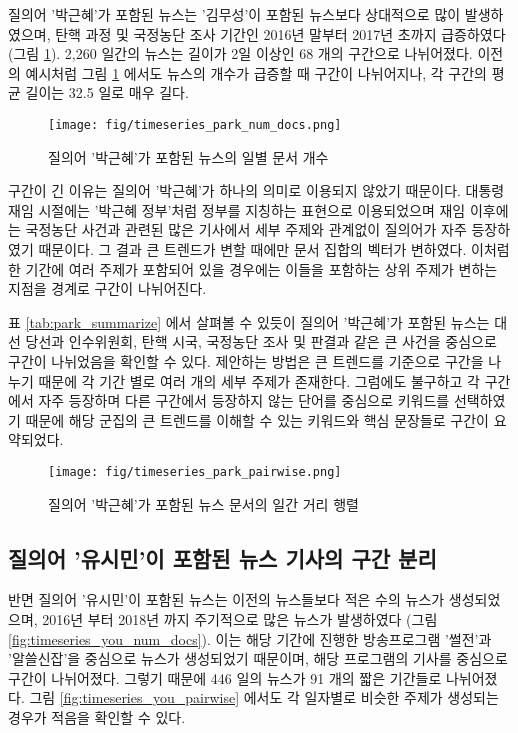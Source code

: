 \documentclass[oneside, ko,phd]{snuthesis_utf8_kor}
\begin{document}
질의어 '박근혜'가 포함된 뉴스는 '김무성'이 포함된 뉴스보다 상대적으로 많이 발생하였으며, 탄핵 과정 및 국정농단 조사 기간인 2016년 말부터 2017년 초까지 급증하였다 (그림 \ref{fig:timeseries_park_num_docs}).
2,260 일간의 뉴스는 길이가 2일 이상인 68 개의 구간으로 나뉘어졌다.
이전의 예시처럼 그림 \ref{fig:timeseries_park_num_docs} 에서도 뉴스의 개수가 급증할 때 구간이 나뉘어지나, 각 구간의 평균 길이는 32.5 일로 매우 길다.

\begin{figure}[H]
\centering
\texttt{[image: fig/timeseries\_park\_num\_docs.png]}
\caption{질의어 '박근혜'가 포함된 뉴스의 일별 문서 개수}
\label{fig:timeseries_park_num_docs}
\end{figure}

구간이 긴 이유는 질의어 '박근혜'가 하나의 의미로 이용되지 않았기 때문이다.
대통령 재임 시절에는 '박근혜 정부'처럼 정부를 지칭하는 표현으로 이용되었으며 재임 이후에는 국정농단 사건과 관련된 많은 기사에서 세부 주제와 관계없이 질의어가 자주 등장하였기 때문이다.
그 결과 큰 트렌드가 변할 때에만 문서 집합의 벡터가 변하였다.
이처럼 한 기간에 여러 주제가 포함되어 있을 경우에는 이들을 포함하는 상위 주제가 변하는 지점을 경계로 구간이 나뉘어진다.

표 \ref{tab:park_summarize} 에서 살펴볼 수 있듯이 질의어 '박근혜'가 포함된 뉴스는 대선 당선과 인수위원회, 탄핵 시국, 국정농단 조사 및 판결과 같은 큰 사건을 중심으로 구간이 나뉘었음을 확인할 수 있다.
제안하는 방법은 큰 트렌드를 기준으로 구간을 나누기 때문에 각 기간 별로 여러 개의 세부 주제가 존재한다.
그럼에도 불구하고 각 구간에서 자주 등장하며 다른 구간에서 등장하지 않는 단어를 중심으로 키워드를 선택하였기 때문에 해당 군집의 큰 트렌드를 이해할 수 있는 키워드와 핵심 문장들로 구간이 요약되었다.

\begin{figure}[H]
\centering
\texttt{[image: fig/timeseries\_park\_pairwise.png]}
\caption{질의어 '박근혜'가 포함된 뉴스 문서의 일간 거리 행렬}
\label{fig:timeseries_park_pairwise}
\end{figure}

\subsection{질의어 '유시민'이 포함된 뉴스 기사의 구간 분리}

반면 질의어 '유시민'이 포함된 뉴스는 이전의 뉴스들보다 적은 수의 뉴스가 생성되었으며, 2016년 부터 2018년 까지 주기적으로 많은 뉴스가 발생하였다 (그림 \ref{fig:timeseries_you_num_docs}).
이는 해당 기간에 진행한 방송프로그램 '썰전'과 '알쓸신잡'을 중심으로 뉴스가 생성되었기 때문이며, 해당 프로그램의 기사를 중심으로 구간이 나뉘어졌다.
그렇기 때문에 446 일의 뉴스가 91 개의 짧은 기간들로 나뉘어졌다.
그림 \ref{fig:timeseries_you_pairwise} 에서도 각 일자별로 비슷한 주제가 생성되는 경우가 적음을 확인할 수 있다.
\end{document}

